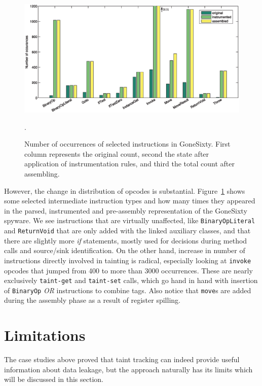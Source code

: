 \documentclass[12pt,twoside,notitlepage]{report}
\begin{document}
\begin{figure}
	\centerline{	
		\includegraphics[width=\textwidth]{figs/fig_eval_codebloat.eps}
	}
	\caption{Number of occurrences of selected instructions in GoneSixty. First column represents the original count, second the state after application of instrumentation rules, and third the total count after assembling.}.
	\label{figure:Evalutaion_CodeBloat}
\end{figure}

However, the change in distribution of opcodes is substantial. Figure~\ref{figure:Evalutaion_CodeBloat} shows some selected intermediate instruction types and how many times they appeared in the parsed, instrumented and pre-assembly representation of the GoneSixty spyware. We see instructions that are virtually unaffected, like \verb$BinaryOpLiteral$ and \verb$ReturnVoid$ that are only added with the linked auxiliary classes, and that there are slightly more \emph{if} statements, mostly used for decisions during method calls and source/sink identification. On the other hand, increase in number of instructions directly involved in tainting is radical, especially looking at \verb$invoke$ opcodes that jumped from 400 to more than 3000 occurrences. These are nearly exclusively \verb$taint-get$ and \verb$taint-set$ calls, which go hand in hand with insertion of \verb$BinaryOp$ \emph{OR} instructions to combine tags. Also notice that \verb$move$s are added during the assembly phase as a result of register spilling.

\section{Limitations}

The case studies above proved that taint tracking can indeed provide useful information about data leakage, but the approach naturally has its limits which will be discussed in this section. 
\end{document}
